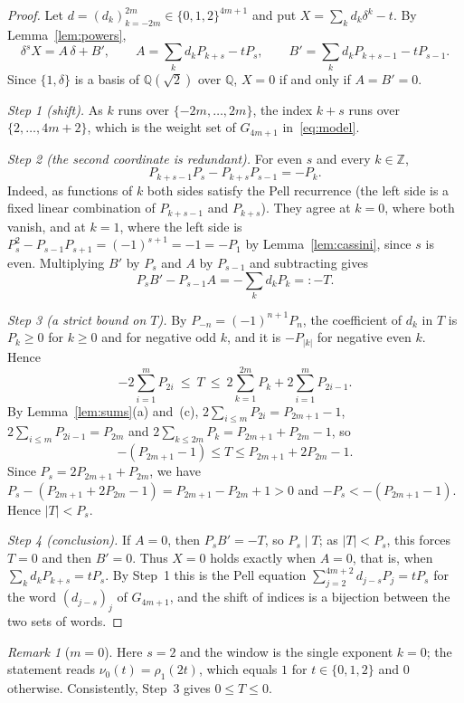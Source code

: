 \documentclass[11pt]{amsart}
\theoremstyle{definition}
\theoremstyle{remark}
\newtheorem{remark}[lemma]{Remark}
\theoremstyle{plain}
\numberwithin{equation}{section}
\newcommand{\Z}{\mathbb{Z}}
\newcommand{\Q}{\mathbb{Q}}
\begin{document}
\begin{proof}
Let $d=(d_k)_{k=-2m}^{2m}\in\{0,1,2\}^{4m+1}$ and put $X=\sum_kd_k\delta^k-t$. By
Lemma~\ref{lem:powers},
\[
\delta^sX=A\,\delta+B',\qquad A=\sum_kd_kP_{k+s}-tP_s,\qquad B'=\sum_kd_kP_{k+s-1}-tP_{s-1}.
\]
Since $\{1,\delta\}$ is a basis of $\Q(\sqrt2)$ over $\Q$, $X=0$ if and only if $A=B'=0$.

\emph{Step 1 (shift).} As $k$ runs over $\{-2m,\dots,2m\}$, the index $k+s$ runs over
$\{2,\dots,4m+2\}$, which is the weight set of $G_{4m+1}$ in~\eqref{eq:model}.

\emph{Step 2 (the second coordinate is redundant).} For even $s$ and every $k\in\Z$,
\begin{equation}\label{eq:redund}
P_{k+s-1}P_s-P_{k+s}P_{s-1}=-P_k.
\end{equation}
Indeed, as functions of $k$ both sides satisfy the Pell recurrence (the left side is a fixed linear
combination of $P_{k+s-1}$ and $P_{k+s}$). They agree at $k=0$, where both vanish, and at $k=1$,
where the left side is $P_s^2-P_{s-1}P_{s+1}=(-1)^{s+1}=-1=-P_1$ by Lemma~\ref{lem:cassini}, since
$s$ is even. Multiplying $B'$ by $P_s$ and $A$ by $P_{s-1}$ and subtracting gives
\[
P_sB'-P_{s-1}A=-\sum_kd_kP_k=:-T .
\]

\emph{Step 3 (a strict bound on $T$).} By $P_{-n}=(-1)^{n+1}P_n$, the coefficient of $d_k$ in $T$ is
$P_k\ge0$ for $k\ge0$ and for negative odd $k$, and it is $-P_{|k|}$ for negative even $k$. Hence
\[
-2\sum_{i=1}^{m}P_{2i}\ \le\ T\ \le\ 2\sum_{k=1}^{2m}P_k+2\sum_{i=1}^{m}P_{2i-1}.
\]
By Lemma~\ref{lem:sums}(a) and~(c), $2\sum_{i\le m}P_{2i}=P_{2m+1}-1$,
$2\sum_{i\le m}P_{2i-1}=P_{2m}$ and $2\sum_{k\le2m}P_k=P_{2m+1}+P_{2m}-1$, so
\[
-(P_{2m+1}-1)\le T\le P_{2m+1}+2P_{2m}-1 .
\]
Since $P_s=2P_{2m+1}+P_{2m}$, we have $P_s-(P_{2m+1}+2P_{2m}-1)=P_{2m+1}-P_{2m}+1>0$ and
$-P_s<-(P_{2m+1}-1)$. Hence $|T|<P_s$.

\emph{Step 4 (conclusion).} If $A=0$, then $P_sB'=-T$, so $P_s\mid T$; as $|T|<P_s$, this forces
$T=0$ and then $B'=0$. Thus $X=0$ holds exactly when $A=0$, that is, when
$\sum_kd_kP_{k+s}=tP_s$. By Step~1 this is the Pell equation $\sum_{j=2}^{4m+2}d_{j-s}P_j=tP_s$ for
the word $(d_{j-s})_j$ of $G_{4m+1}$, and the shift of indices is a bijection between the two sets of
words.
\end{proof}

\begin{remark}[$m=0$]\label{rem:m0}
Here $s=2$ and the window is the single exponent $k=0$; the statement reads
$\nu_0(t)=\rho_1(2t)$, which equals $1$ for $t\in\{0,1,2\}$ and $0$ otherwise. Consistently,
Step~3 gives $0\le T\le0$.
\end{remark}
\end{document}
